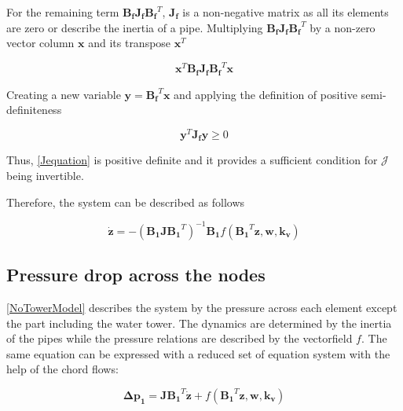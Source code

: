 For the remaining term $\bm{B_f J_f {B_f}}^T$, $\bm{J_f}$ is a non-negative matrix as all its elements are zero or describe the inertia of a pipe. 
Multiplying $\bm{B_f J_f {B_f}}^T$ by a non-zero vector column $\mathbf{x}$ and its transpose $\mathbf{x}^{T}$

\begin{equation}
  \bm{x}^{T} \bm{B_f J_f {B_f}}^T \bm{x}
  \label{PosDefi}
\end{equation}

Creating a new variable $\bm{y} = \bm{B_f}^T \mathbf{x}$ and applying the definition of positive semi-definiteness 
\cite{MatrixBook}

\begin{equation}
  \bm{y}^{T} \bm{J_f y} \geqslant 0
  \label{PosDefEq}
\end{equation}

Thus, \eqref{Jequation} is positive definite and it provides a sufficient condition for $\bm{\mathcal{J}}$ being invertible. 

Therefore, the system can be described as follows

\begin{equation}
   \bm{\dot{z}}  = - (\bm{B_1 J {B_1}}^T)^{-1}\bm{B_1} f({\bm{B_1}}^T \bm{z},\bm{ w}, \bm{k_v})
   \label{ParatModelFinal}
 \end{equation}

\subsection{Pressure drop across the nodes}
\label{ModelRelationSection}



\eqref{NoTowerModel} describes the system by the pressure across each element except the part including the water tower. The dynamics are determined by the inertia of the pipes while the pressure relations are described by the vectorfield $f$. 
The same equation can be expressed with a reduced set of equation system with the help of the chord flows: 

\begin{equation}
  \bm{\Delta p_1} =  \bm{J {B_1}}^T \bm{\dot{z}} + f({\bm{B_1}}^T \bm{z}, \bm{w}, \bm{k_v})
 \end{equation}

